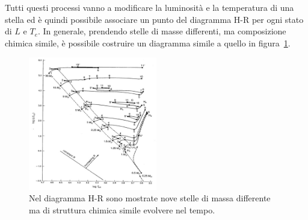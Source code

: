 Tutti questi processi vanno a modificare la luminosità e la temperatura di una stella ed è quindi possibile associare un punto del diagramma H-R per ogni stato di $L$ e $T_e$. In generale, prendendo stelle di masse differenti, ma composizione chimica simile, è possibile costruire un diagramma simile a quello in figura~\ref{fig:evo}.
\begin{figure}
    \centering
    \includegraphics[width=0.5\textwidth]{immagini/evo.png}
    \caption{Nel diagramma H-R sono mostrate nove stelle di massa differente ma di struttura chimica simile evolvere nel tempo.}\label{fig:evo}
\end{figure}